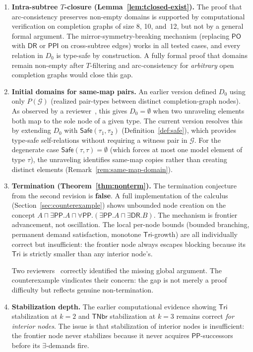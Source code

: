 \documentclass[a4paper,11pt]{article}
\theoremstyle{definition}
\newcommand{\DR}{\ensuremath{\mathsf{DR}}}
\newcommand{\PO}{\ensuremath{\mathsf{PO}}}
\newcommand{\PP}{\ensuremath{\mathsf{PP}}}
\newcommand{\PPI}{\ensuremath{\mathsf{PPI}}}
\newcommand{\Tri}{\ensuremath{\mathsf{Tri}}}
\newcommand{\TNbr}{\ensuremath{\mathsf{TNbr}}}
\newcommand{\Safe}{\ensuremath{\mathsf{Safe}}}
\newcommand{\GG}{\ensuremath{\mathcal{G}}}
\begin{document}
\begin{enumerate}
  \item \textbf{Intra-subtree $T$-closure
    (Lemma~\ref{lem:tclosed-exist}).}
    The proof that arc-consistency preserves non-empty domains
    is supported by computational verification on completion
    graphs of size 8, 10, and~12, but not by a general formal
    argument.  The mirror-symmetry-breaking mechanism (replacing
    $\PO$ with $\DR$ or $\PPI$ on cross-subtree edges) works
    in all tested cases, and every relation in $D_0$ is type-safe
    by construction.  A fully formal proof that domains remain
    non-empty after $T$-filtering and arc-consistency for
    \emph{arbitrary} open completion graphs would close
    this gap.

  \item \textbf{Initial domains for same-map pairs.}
    An earlier version defined $D_0$ using only $P(\GG)$
    (realized pair-types between distinct completion-graph
    nodes).  As observed by a reviewer~\cite{GPTReview2},
    this gives $D_0 = \emptyset$ when two unraveling elements
    both map to the sole node of a given type.  The current
    version resolves this by extending $D_0$ with
    $\Safe(\tau_1, \tau_2)$ (Definition~\ref{def:safe}),
    which provides type-safe self-relations without
    requiring a witness pair in $\GG$.  For the
    degenerate case $\Safe(\tau, \tau) = \emptyset$ (which
    forces at most one model element of type $\tau$), the
    unraveling identifies same-map copies rather than creating
    distinct elements
    (Remark~\ref{rem:same-map-domain}).

  \item \textbf{Termination
    (Theorem~\ref{thm:nonterm}).}
    The termination conjecture from the second revision is
    \textbf{false}.  A full implementation of the calculus
    (Section~\ref{sec:counterexample}) shows unbounded node
    creation on the concept
    $A \sqcap \exists\PP.A \sqcap
    \forall\PP.(\exists\PP.A \sqcap \exists\DR.B)$.
    The mechanism is frontier advancement, not oscillation.
    The local per-node bounds (bounded branching, permanent
    demand satisfaction, monotone $\Tri$-growth) are all
    individually correct but insufficient: the frontier node
    always escapes blocking because its $\Tri$ is strictly
    smaller than any interior node's.

    Two reviewers~\cite{GPTReview,GPTReview2} correctly
    identified the missing global argument.  The counterexample
    vindicates their concern: the gap is not merely a proof
    difficulty but reflects genuine non-termination.

  \item \textbf{Stabilization depth.}
    The earlier computational evidence showing $\Tri$
    stabilization at $k = 2$ and $\TNbr$ stabilization at
    $k = 3$ remains correct \emph{for interior nodes}.
    The issue is that stabilization of interior nodes is
    insufficient: the frontier node never stabilizes
    because it never acquires $\PP$-successors before
    its $\exists$-demands fire.
\end{enumerate}
\end{document}
